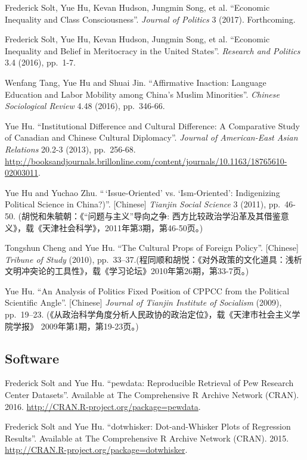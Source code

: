 \documentclass[10.5pt,]{article}
\begin{document}
Frederick Solt, Yue Hu, Kevan Hudson, Jungmin Song, et al. ``Economic
Inequality and Class Consciousness''. \emph{Journal of Politics} 3
(2017). Forthcoming.

Frederick Solt, Yue Hu, Kevan Hudson, Jungmin Song, et al. ``Economic
Inequality and Belief in Meritocracy in the United States''.
\emph{Research and Politics} 3.4 (2016), pp.~1-7.

Wenfang Tang, Yue Hu and Shuai Jin. ``Affirmative Inaction: Language
Education and Labor Mobility among China's Muslim Minorities''.
\emph{Chinese Sociological Review} 4.48 (2016), pp.~346-66.

Yue Hu. ``Institutional Difference and Cultural Difference: A
Comparative Study of Canadian and Chinese Cultural Diplomacy''.
\emph{Journal of American-East Asian Relations} 20.2-3 (2013),
pp.~256-68.
\url{http://booksandjournals.brillonline.com/content/journals/10.1163/18765610-02003011}.

Yue Hu and Yuchao Zhu. ``\,`Issue-Oriented' vs. `Ism-Oriented':
Indigenizing Political Science in China?)''. {[}Chinese{]} \emph{Tianjin
Social Science} 3 (2011), pp.~46-50.
(胡悦和朱毓朝：《``问题与主义''导向之争:
西方比较政治学沿革及其借鉴意义》，载《天津社会科学》，2011年第3期，第46-50页。)

Tongshun Cheng and Yue Hu. ``The Cultural Props of Foreign Policy''.
{[}Chinese{]} \emph{Tribune of Study} (2010),
pp.~33--37.(程同顺和胡悦：《对外政策的文化道具：浅析文明冲突论的工具性》，载《学习论坛》2010年第26期，第33-7页。)

Yue Hu. ``An Analysis of Politics Fixed Position of CPPCC from the
Political Scientific Angle''. {[}Chinese{]} \emph{Journal of Tianjin
Institute of Socialism} (2009), pp.~19--23.
(《从政治科学角度分析人民政协的政治定位》，载《天津市社会主义学院学报》
2009年第1期，第19-23页。)

\subsection{Software}\label{software}

Frederick Solt and Yue Hu. ``pewdata: Reproducible Retrieval of Pew
Research Center Datasets''. Available at The Comprehensive R Archive
Network (CRAN). 2016. \url{http://CRAN.R-project.org/package=pewdata}.

Frederick Solt and Yue Hu. ``dotwhisker: Dot-and-Whisker Plots of
Regression Results''. Available at The Comprehensive R Archive Network
(CRAN). 2015. \url{http://CRAN.R-project.org/package=dotwhisker}.
\end{document}
